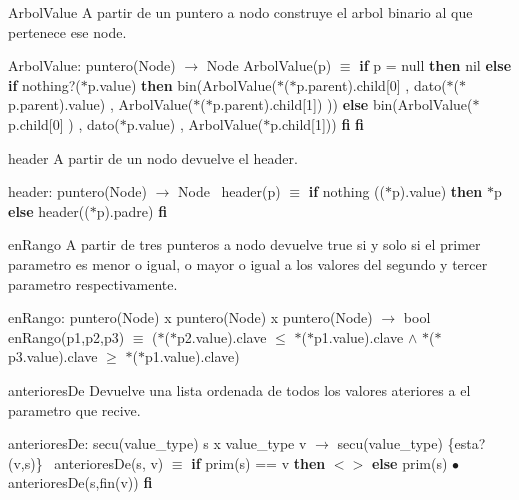\begin{DoxyParagraph}{Arbol\+Value}
A partir de un puntero a nodo construye el arbol binario al que pertenece ese node.

Arbol\+Value\+: puntero(\+Node) $\to$ Node Arbol\+Value(p) $\equiv$ {\bfseries if} p = null {\bfseries then} nil {\bfseries else} {\bfseries if} nothing?($\ast$p.value) {\bfseries then} bin(Arbol\+Value($\ast$($\ast$p.parent).child\mbox{[}0\mbox{]} , dato($\ast$($\ast$p.parent).value) , Arbol\+Value($\ast$($\ast$p.parent).child\mbox{[}1\mbox{]}) )) {\bfseries else} bin(Arbol\+Value($\ast$p.child\mbox{[}0\mbox{]} ) , dato($\ast$p.value) , Arbol\+Value($\ast$p.child\mbox{[}1\mbox{]})) {\bfseries fi} {\bfseries fi} 
\end{DoxyParagraph}


\begin{DoxyParagraph}{header}
A partir de un nodo devuelve el header.

header\+: puntero(\+Node) $\to$ Node~\newline
 header(p) $\equiv$ {\bfseries if} nothing (($\ast$p).value) {\bfseries then} $\ast$p {\bfseries else} header(($\ast$p).padre) {\bfseries fi} 
\end{DoxyParagraph}


\begin{DoxyParagraph}{en\+Rango}
A partir de tres punteros a nodo devuelve true si y solo si el primer parametro es menor o igual, o mayor o igual a los valores del segundo y tercer parametro respectivamente.

en\+Rango\+: puntero(\+Node) x puntero(\+Node) x puntero(\+Node) $\to$ bool~\newline
 en\+Rango(p1,p2,p3) $\equiv$ ($\ast$($\ast$p2.value).clave $\leq$ $\ast$($\ast$p1.value).clave $\land$ $\ast$($\ast$p3.value).clave $\geq$ $\ast$($\ast$p1.value).clave) 
\end{DoxyParagraph}


\begin{DoxyParagraph}{anteriores\+De}
Devuelve una lista ordenada de todos los valores ateriores a el parametro que recive.

anteriores\+De\+: secu(value\+\_\+type) s x value\+\_\+type v $\to$ secu(value\+\_\+type) \{esta?(v,s)\}~\newline
 anteriores\+De(s, v) $\equiv$ {\bfseries if} prim(s) == v {\bfseries then} $<$$>$ {\bfseries else} prim(s) $\bullet$ anteriores\+De(s,fin(v)) {\bfseries fi} 
\end{DoxyParagraph}


